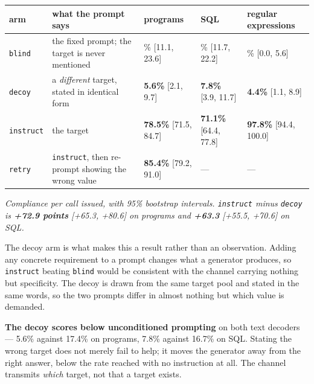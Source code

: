 \documentclass[
  10pt,
]{article}
\theoremstyle{plain}
\theoremstyle{definition}
\begin{document}
{\footnotesize
\begin{longtable}[]{@{}>{\raggedright\arraybackslash}p{}>{\raggedright\arraybackslash}p{}>{\raggedright\arraybackslash}p{}>{\raggedright\arraybackslash}p{}>{\raggedright\arraybackslash}p{}@{}}
\toprule\noalign{}
arm & what the prompt says & programs & SQL & regular expressions \\
\midrule\noalign{}
\endhead
\bottomrule\noalign{}
\endlastfoot
\texttt{blind} & the fixed prompt; the target is never mentioned &
17.4\% {[}11.1, 23.6{]} & 16.7\% {[}11.7, 22.2{]} & 2.2\% {[}0.0,
5.6{]} \\
\texttt{decoy} & a \emph{different} target, stated in identical form &
\textbf{5.6\%} {[}2.1, 9.7{]} & \textbf{7.8\%} {[}3.9, 11.7{]} &
\textbf{4.4\%} {[}1.1, 8.9{]} \\
\texttt{instruct} & the target & \textbf{78.5\%} {[}71.5, 84.7{]} &
\textbf{71.1\%} {[}64.4, 77.8{]} & \textbf{97.8\%} {[}94.4, 100.0{]} \\
\texttt{retry} & \texttt{instruct}, then re-prompt showing the wrong
value & \textbf{85.4\%} {[}79.2, 91.0{]} & --- & --- \\
\end{longtable}}

\emph{Compliance per call issued, with 95\% bootstrap intervals.
\texttt{instruct} minus \texttt{decoy} is \textbf{+72.9 points}
{[}+65.3, +80.6{]} on programs and \textbf{+63.3} {[}+55.5, +70.6{]} on
SQL.}

The decoy arm is what makes this a result rather than an observation.
Adding any concrete requirement to a prompt changes what a generator
produces, so \texttt{instruct} beating \texttt{blind} would be
consistent with the channel carrying nothing but specificity. The decoy
is drawn from the same target pool and stated in the same words, so the
two prompts differ in almost nothing but which value is demanded.

\textbf{The decoy scores below unconditioned prompting} on both text
decoders --- 5.6\% against 17.4\% on programs, 7.8\% against 16.7\% on
SQL. Stating the wrong target does not merely fail to help; it moves the
generator away from the right answer, below the rate reached with no
instruction at all. The channel transmits \emph{which} target, not that
a target exists.
\end{document}

